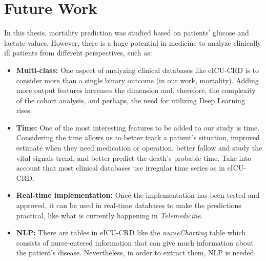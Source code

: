 \chapter{Future Work}\label{chap:future}

In this thesis, mortality prediction was studied based on patients' glucose and lactate values. However, there is a huge potential in medicine to analyze clinically ill patients from different perspectives, such as:

\begin{itemize}
    \item \textbf{Multi-class:} One aspect of analyzing clinical databases like \acrshort{eICU-CRD} is to consider more than a single binary outcome (in our work, mortality). Adding more output features increases the dimension and, therefore, the complexity of the cohort analysis, and perhaps, the need for utilizing Deep Learning rises. 
    \item \textbf{Time:} One of the most interesting features to be added to our study is time. Considering the time allows us to better track a patient's situation, improved estimate when they need medication or operation, better follow and study the vital signals trend, and better predict the death's probable time. Take into account that most clinical databases use irregular time series as in \acrshort{eICU-CRD}.
    \item \textbf{Real-time implementation:} Once the implementation has been tested and approved, it can be used in real-time databases to make the predictions practical, like what is currently happening in \textit{Telemedicine}.
    \item \textbf{\acrlong{NLP}:} There are tables in \acrshort{eICU-CRD} like the \textit{nurseCharting} table which consists of nurse-entered information that can give much information about the patient's disease. Nevertheless, in order to extract them, \acrshort{NLP} is needed.
    \end{itemize}